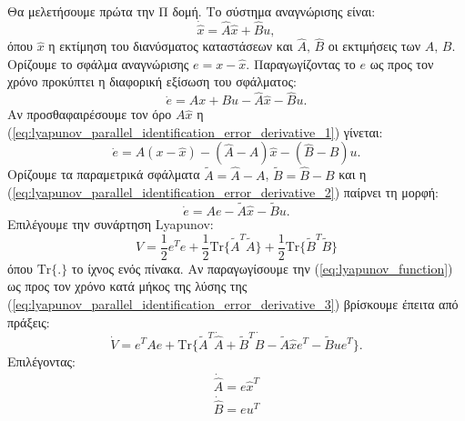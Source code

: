 \documentclass[a4paper,12pt]{article}
\begin{document}
Θα μελετήσουμε πρώτα την Π δομή. Το σύστημα αναγνώρισης είναι:
\begin{equation}
    \dot{\hat{x}} = \hat{A}\hat{x} + \hat{B} u,
    \label{eq:lyapunov_parallel_identification_system}
\end{equation}
όπου $\hat{x}$ η εκτίμηση του διανύσματος καταστάσεων και $\hat{A}, \, \hat{B}$ οι εκτιμήσεις των $A, \, B$.
Ορίζουμε το σφάλμα αναγνώρισης $e = x - \hat{x}$. Παραγωγίζοντας το $e$ ως προς τον χρόνο προκύπτει η διαφορική
εξίσωση του σφάλματος:
\begin{equation}
    \dot{e} = Ax + Bu - \hat{A}\hat{x} - \hat{B}u.
    \label{eq:lyapunov_parallel_identification_error_derivative_1}
\end{equation}
Αν προσθαφαιρέσουμε τον όρο $A\hat{x}$ η (\ref{eq:lyapunov_parallel_identification_error_derivative_1}) γίνεται:
\begin{equation}
    \dot{e} = A(x - \hat{x}) - (\hat{A} - A)\hat{x} - (\hat{B} - B)u.
    \label{eq:lyapunov_parallel_identification_error_derivative_2}
\end{equation}
Ορίζουμε τα παραμετρικά σφάλματα $\tilde{A} = \hat{A} - A$, $\tilde{B} = \hat{B} - B$ και η 
(\ref{eq:lyapunov_parallel_identification_error_derivative_2}) παίρνει τη μορφή:
\begin{equation}
    \dot{e} = Ae -\tilde{A}\hat{x} - \tilde{B}u.
    \label{eq:lyapunov_parallel_identification_error_derivative_3}
\end{equation}
Επιλέγουμε την συνάρτηση Lyapunov:
\begin{equation}
    V = \frac{1}{2}e^Te + \frac{1}{2}\mathrm{Tr}\{\tilde{A}^T\tilde{A}\} + 
    \frac{1}{2}\mathrm{Tr}\{\tilde{B}^T\tilde{B}\}
    \label{eq:lyapunov_function}
\end{equation}
όπου $\mathrm{Tr\{.\}}$ το ίχνος ενός πίνακα. Αν παραγωγίσουμε την (\ref{eq:lyapunov_function}) ως προς τον
χρόνο κατά μήκος της λύσης της (\ref{eq:lyapunov_parallel_identification_error_derivative_3}) βρίσκουμε έπειτα
από πράξεις:
\begin{equation}
    \dot{V} = e^TAe + \mathrm{Tr}\{\tilde{A}^T\dot{\hat{A}} + \tilde{B}^T\dot{\hat{B}} - 
    \tilde{A}\hat{x}e^T - \tilde{B}ue^T\}.
    \label{eq:lyapunov_parallel_function_derivative_1}
\end{equation}
Επιλέγοντας:
\begin{equation}
    \begin{aligned}
        \dot{\hat{A}} = e \hat{x}^T \\ 
        \dot{\hat{B}} = eu^T
    \end{aligned}
    \label{eq:lyapunov_parallel_update_formula}
\end{equation}
\end{document}
